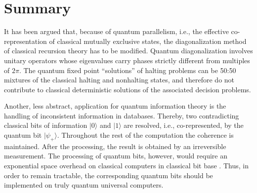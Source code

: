 \documentclass[prl,amsfonts,amsmath,showpacs,showkeys,preprint]{revtex4}
\begin{document}
\section{Summary}

It has been argued that, because of quantum parallelism,
i.e., the effective co-representation of classical mutually exclusive states, the diagonalization method of classical recursion theory has to be modified.
Quantum diagonalization involves unitary operators whose eigenvalues carry phases strictly different from multiples of $2 \pi$.
The quantum fixed point ``solutions'' of halting problems can be 50:50 mixtures of the classical halting
and nonhalting states, and therefore do not contribute to classical deterministic solutions of the associated decision problems.

Another, less abstract, application for quantum information theory is
the handling of inconsistent information in databases.
Thereby,
two contradicting classical bits of information
$\vert 0 \rangle$ and
$\vert 1 \rangle$ are resolved, i.e., co-represented, by the quantum bit
$\vert \psi_+ \rangle$.
Throughout the rest of the computation the coherence is maintained.
After the processing, the result is obtained by an irreversible
measurement. The processing of quantum bits, however, would require an
exponential
space overhead on classical computers in classical bit base \cite{feynman}.
Thus, in order to remain tractable,
the corresponding quantum bits should be implemented on
truly quantum universal computers.

%
%
\end{document}
